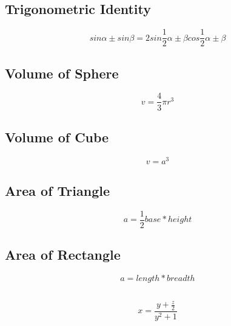 \documentclass{article}
\begin{document}
\subsection{Trigonometric Identity}
$$
sin\alpha \pm sin\beta=2sin\frac{1}{2}{\alpha\pm\beta}cos\frac{1}{2}{\alpha\pm\beta}
$$
\subsection{Volume of Sphere}
$$
v=\frac{4}{3}\pi r^{3}
$$
\subsection{Volume of Cube}
$$
v=a^{3}
$$
\subsection{Area of Triangle}
$$
a=\frac{1}{2}{base*height}
$$
\subsection{Area of Rectangle}
$$
a=length*breadth
$$
\subsection{}
$$
x=\frac{y+\frac{z}{2}}{y^{2}+1}
$$
\end{document}

